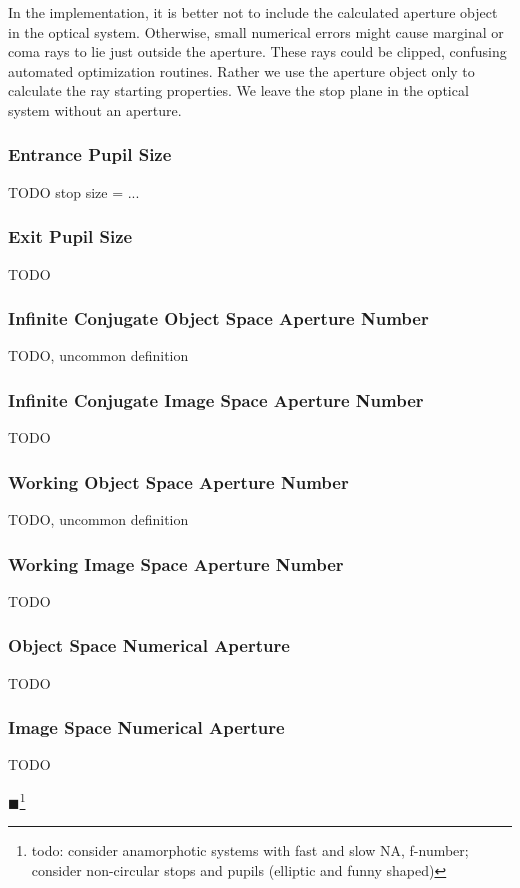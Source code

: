 \documentclass[12pt,a4paper,twoside,openright,BCOR10mm,headsepline,titlepage,abstracton,chapterprefix,final]{scrreprt}
\newcommand{\remark}[1]{{\color{red}$\blacksquare$}\footnote{{\color{red}#1}}}
\begin{document}
In the implementation, it is better not to include the calculated aperture object in the optical system.
Otherwise, small numerical errors might cause marginal or coma rays to lie just outside the aperture.
These rays could be clipped, confusing automated optimization routines.
Rather we use the aperture object only to calculate the ray starting properties.
We leave the stop plane in the optical system without an aperture.


\subsubsection{Entrance Pupil Size}
TODO
stop size = ...

\subsubsection{Exit Pupil Size}
TODO

\subsubsection{Infinite Conjugate Object Space Aperture Number}
TODO, uncommon definition

\subsubsection{Infinite Conjugate Image Space Aperture Number}
TODO

\subsubsection{Working Object Space Aperture Number}
TODO, uncommon definition

\subsubsection{Working Image Space Aperture Number}
TODO

\subsubsection{Object Space Numerical Aperture}
TODO

\subsubsection{Image Space Numerical Aperture}
TODO

\remark{todo: consider anamorphotic systems with fast and slow NA, f-number; consider non-circular stops and pupils (elliptic and funny shaped)}
\end{document}
